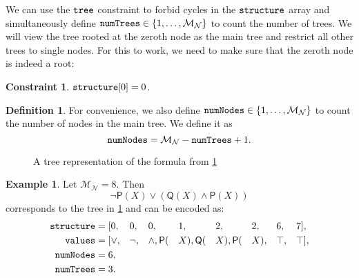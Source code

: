 \documentclass[letterpaper]{article}
\newtheorem{constraint}{Constraint}
\theoremstyle{definition}
\newtheorem{definition}{Definition}
\newtheorem{example}{Example}
\newcommand{\variable}[1]{\texttt{\textup{#1}}}
\newcommand{\maxNumNodes}{\mathcal{M}_{\mathcal{N}}}
\begin{document}
We can use the $\variable{tree}$ constraint \citep{DBLP:conf/cp/FagesL11} to
forbid cycles in the $\variable{structure}$ array and simultaneously define
$\variable{numTrees} \in \{ 1, \dots, \maxNumNodes{} \}$ to count the number of
trees. We will view the tree rooted at the zeroth node as the main tree and
restrict all other trees to single nodes. For this to work, we need to make sure
that the zeroth node is indeed a root:

\begin{constraint}
  $\variable{structure}[0] = 0$.
\end{constraint}

\begin{definition}
  For convenience, we also define $\variable{numNodes} \in \{ 1, \dots,
  \maxNumNodes{} \}$ to count the number of nodes in the main tree. We define it
  as
  \[
    \variable{numNodes} = \maxNumNodes{} - \variable{numTrees} + 1.
  \]
\end{definition}

\begin{figure}
  \centering
  \caption{A tree representation of the formula from \cref{example:formula}}
  \label{fig:example_tree}
\end{figure}

\begin{example} \label{example:formula}
  Let $\maxNumNodes{} = 8$. Then
  \[
    \neg\mathsf{P}(X) \lor (\mathsf{Q}(X) \land \mathsf{P}(X))
  \]
  corresponds to the tree in \cref{fig:example_tree} and can be encoded as:
  \begin{alignat*}{8}
    \variable{structure} &= [0, &&0, &&0, &&1, &&2, &&2, &&6, &&7],\\
    \variable{values} &= [{\lor}, &&{\neg}, &&{\land}, \mathsf{P}(&&X), \mathsf{Q}(&&X), \mathsf{P}(&&X), &&\top, &&\top],\\
    \variable{numNodes} &= 6, && && && && && && &&\\
    \variable{numTrees} &= 3. && && && && && && &&
  \end{alignat*}
\end{example}
\end{document}
